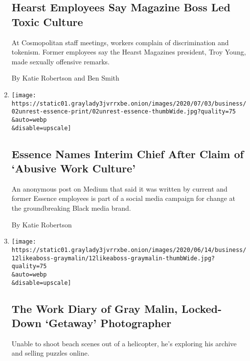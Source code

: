 \begin{enumerate}
{  \subsection{Hearst Employees Say Magazine Boss Led Toxic
  Culture}\label{hearst-employees-say-magazine-boss-led-toxic-culture}}

  At Cosmopolitan staff meetings, workers complain of discrimination and
  tokenism. Former employees say the Hearst Magazines president, Troy
  Young, made sexually offensive remarks.

  By Katie Robertson and Ben Smith
\item
  \href{/2020/07/02/business/media/essence-magazine-accusations.html}{}

  \texttt{[image: https://static01.graylady3jvrrxbe.onion/images/2020/07/03/business/02unrest-essence-print/02unrest-essence-thumbWide.jpg?quality=75\\\&auto=webp\\\&disable=upscale]}

  \hypertarget{essence-names-interim-chief-after-claim-of-abusive-work-culture}{%
  \subsection{Essence Names Interim Chief After Claim of `Abusive Work
  Culture'}\label{essence-names-interim-chief-after-claim-of-abusive-work-culture}}

  An anonymous post on Medium that said it was written by current and
  former Essence employees is part of a social media campaign for change
  at the groundbreaking Black media brand.

  By Katie Robertson
\item
  \href{/2020/06/12/business/gray-malin-work-diary.html}{}

  \texttt{[image: https://static01.graylady3jvrrxbe.onion/images/2020/06/14/business/12likeaboss-graymalin/12likeaboss-graymalin-thumbWide.jpg?quality=75\\\&auto=webp\\\&disable=upscale]}

  \hypertarget{the-work-diary-of-gray-malin-locked-down-getaway-photographer}{%
  \subsection{The Work Diary of Gray Malin, Locked-Down `Getaway'
  Photographer}\label{the-work-diary-of-gray-malin-locked-down-getaway-photographer}}

  Unable to shoot beach scenes out of a helicopter, he's exploring his
  archive and selling puzzles online.


\end{enumerate}
